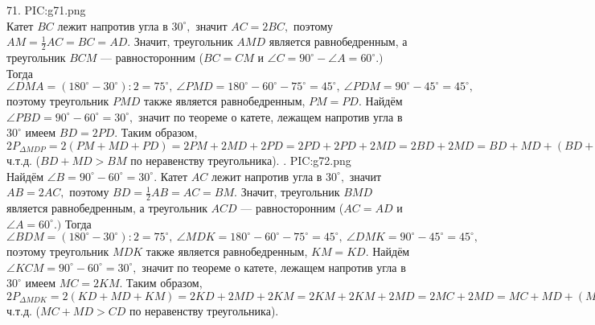 71. {{PIC:g71.png}}\\
Катет $BC$ лежит напротив угла в $30^\circ,$ значит $AC=2BC,$ поэтому $AM=\frac{1}{2}AC=BC=AD.$ Значит, треугольник $AMD$ является равнобедренным, а треугольник $BCM$ --- равносторонним ($BC=CM$ и $\angle C=90^\circ-\angle A=60^\circ.)$ Тогда $\angle DMA=(180^\circ-30^\circ):2=75^\circ,\ \angle PMD=180^\circ-60^\circ-75^\circ=45^\circ,\ \angle PDM=90^\circ-45^\circ=45^\circ,$ поэтому треугольник $PMD$ также является равнобедренным, $PM=PD.$ Найдём $\angle PBD=90^\circ-60^\circ=30^\circ,$ значит по теореме о катете, лежащем напротив угла в $30^\circ$ имеем $BD=2PD.$ Таким образом, $2P_{\Delta MDP}=2(PM+MD+PD)=
2PM+2MD+2PD=2PD+2PD+2MD=2BD+2MD=BD+MD+(BD+MD)>BD+MD+BM=P_{\Delta MDB},$ ч.т.д. ($BD+MD>BM$ по неравенству треугольника).\newpage
{}. {{PIC:g72.png}}\\
Найдём $\angle B=90^\circ-60^\circ=30^\circ.$ Катет $AC$ лежит напротив угла в $30^\circ,$ значит $AB=2AC,$ поэтому $BD=\frac{1}{2}AB=AC=BM.$ Значит, треугольник $BMD$ является равнобедренным, а треугольник $ACD$ --- равносторонним ($AC=AD$ и $\angle A=60^\circ.)$ Тогда $\angle BDM=(180^\circ-30^\circ):2=75^\circ,\ \angle MDK=180^\circ-60^\circ-75^\circ=45^\circ,\ \angle DMK=90^\circ-45^\circ=45^\circ,$ поэтому треугольник $MDK$ также является равнобедренным, $KM=KD.$ Найдём $\angle KCM=90^\circ-60^\circ=30^\circ,$ значит по теореме о катете, лежащем напротив угла в $30^\circ$ имеем $MC=2KM.$ Таким образом, $2P_{\Delta MDK}=2(KD+MD+KM)=
2KD+2MD+2KM=2KM+2KM+2MD=2MC+2MD=MC+MD+(MC+MD)>MC+MD+CD=P_{\Delta DMC},$ ч.т.д. ($MC+MD>CD$ по неравенству треугольника).\\
